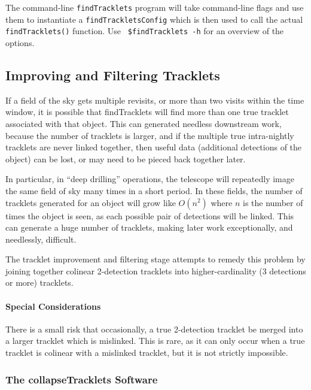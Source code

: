 The command-line {\tt findTracklets} program will take command-line
flags and use them to instantiate a {\tt findTrackletsConfig} which is
then used to call the actual {\tt findTracklets()} function.  Use {\tt
  \$findTracklets -h} for an overview of the options.








\subsection{Improving and Filtering Tracklets} \label{collapseTracklets}
If a field of the sky gets multiple revisits, or more than two visits
within the time window, it is possible that findTracklets will find
more than one true tracklet associated with that object.  This can
generated needless downstream work, because the number of tracklets is
larger, and if the multiple true intra-nightly tracklets are never
linked together, then useful data (additional detections of the
object) can be lost, or may need to be pieced back together later.

In particular, in ``deep drilling'' operations, the telescope will
repeatedly image the same field of sky many times in a short period.
In these fields, the number of tracklets generated for an object will
grow like $O(n^2)$ where $n$ is the number of times the object is
seen, as each possible pair of detections will be linked.  This can
generate a huge number of tracklets, making later work exceptionally,
and needlessly, difficult.

The tracklet improvement and filtering stage attempts to remedy this
problem by joining together colinear 2-detection tracklets into
higher-cardinality (3 detections or more) tracklets.


\paragraph{Special Considerations}
There is a small risk that occasionally, a true 2-detection tracklet
be merged into a larger tracklet which is mislinked.  This is rare, as
it can only occur when a true tracklet is colinear with a mislinked
tracklet, but it is not strictly impossible.



\subsubsection{The collapseTracklets Software} 

